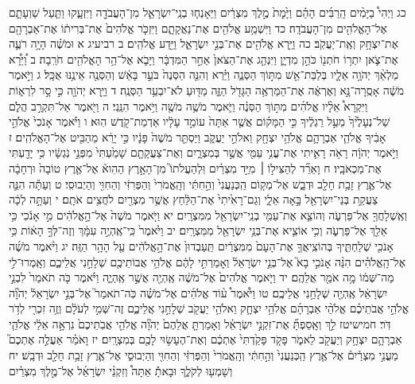 \documentclass[twoside, openany, parskip=half, 11pt]{book}
\begin{document}
כג וַיְהִי֩ בַיָּמִ֨ים הָֽרַבִּ֜ים הָהֵ֗ם וַיָּ֙מׇת֙ מֶ֣לֶךְ מִצְרַ֔יִם וַיֵּאָנְח֧וּ בְנֵֽי־יִשְׂרָאֵ֛ל מִן־הָעֲבֹדָ֖ה וַיִּזְעָ֑קוּ וַתַּ֧עַל שַׁוְעָתָ֛ם אֶל־הָאֱלֹהִ֖ים מִן־הָעֲבֹדָֽה׃ כד וַיִּשְׁמַ֥ע אֱלֹהִ֖ים אֶת־נַאֲקָתָ֑ם וַיִּזְכֹּ֤ר אֱלֹהִים֙ אֶת־בְּרִית֔וֹ אֶת־אַבְרָהָ֖ם אֶת־יִצְחָ֥ק וְאֶֽת־יַעֲקֹֽב׃ כה וַיַּ֥רְא אֱלֹהִ֖ים אֶת־בְּנֵ֣י יִשְׂרָאֵ֑ל וַיֵּ֖דַע אֱלֹהִֽים׃
ב רביעיג א וּמֹשֶׁ֗ה הָיָ֥ה רֹעֶ֛ה אֶת־צֹ֛אן יִתְר֥וֹ חֹתְנ֖וֹ כֹּהֵ֣ן מִדְיָ֑ן וַיִּנְהַ֤ג אֶת־הַצֹּאן֙ אַחַ֣ר הַמִּדְבָּ֔ר וַיָּבֹ֛א אֶל־הַ֥ר הָאֱלֹהִ֖ים חֹרֵֽבָה׃ ב וַ֠יֵּרָ֠א מַלְאַ֨ךְ יְהֹוָ֥ה אֵלָ֛יו בְּלַבַּת־אֵ֖שׁ מִתּ֣וֹךְ הַסְּנֶ֑ה וַיַּ֗רְא וְהִנֵּ֤ה הַסְּנֶה֙ בֹּעֵ֣ר בָּאֵ֔שׁ וְהַסְּנֶ֖ה אֵינֶ֥נּוּ אֻכָּֽל׃ ג וַיֹּ֣אמֶר מֹשֶׁ֔ה אָסֻֽרָה־נָּ֣א וְאֶרְאֶ֔ה אֶת־הַמַּרְאֶ֥ה הַגָּדֹ֖ל הַזֶּ֑ה מַדּ֖וּעַ לֹא־יִבְעַ֥ר הַסְּנֶֽה׃ ד וַיַּ֥רְא יְהֹוָ֖ה כִּ֣י סָ֣ר לִרְא֑וֹת וַיִּקְרָא֩ אֵלָ֨יו אֱלֹהִ֜ים מִתּ֣וֹךְ הַסְּנֶ֗ה וַיֹּ֛אמֶר מֹשֶׁ֥ה מֹשֶׁ֖ה וַיֹּ֥אמֶר הִנֵּֽנִי׃ ה וַיֹּ֖אמֶר אַל־תִּקְרַ֣ב הֲלֹ֑ם שַׁל־נְעָלֶ֙יךָ֙ מֵעַ֣ל רַגְלֶ֔יךָ כִּ֣י הַמָּק֗וֹם אֲשֶׁ֤ר אַתָּה֙ עוֹמֵ֣ד עָלָ֔יו אַדְמַת־קֹ֖דֶשׁ הֽוּא׃ ו וַיֹּ֗אמֶר אָנֹכִי֙ אֱלֹהֵ֣י אָבִ֔יךָ אֱלֹהֵ֧י אַבְרָהָ֛ם אֱלֹהֵ֥י יִצְחָ֖ק וֵאלֹהֵ֣י יַעֲקֹ֑ב וַיַּסְתֵּ֤ר מֹשֶׁה֙ פָּנָ֔יו כִּ֣י יָרֵ֔א מֵהַבִּ֖יט אֶל־הָאֱלֹהִֽים׃ ז וַיֹּ֣אמֶר יְהֹוָ֔ה רָאֹ֥ה רָאִ֛יתִי אֶת־עֳנִ֥י עַמִּ֖י אֲשֶׁ֣ר בְּמִצְרָ֑יִם וְאֶת־צַעֲקָתָ֤ם שָׁמַ֙עְתִּי֙ מִפְּנֵ֣י נֹֽגְשָׂ֔יו כִּ֥י יָדַ֖עְתִּי אֶת־מַכְאֹבָֽיו׃ ח וָאֵרֵ֞ד לְהַצִּיל֣וֹ ׀ מִיַּ֣ד מִצְרַ֗יִם וּֽלְהַעֲלֹתוֹ֮ מִן־הָאָ֣רֶץ הַהִוא֒ אֶל־אֶ֤רֶץ טוֹבָה֙ וּרְחָבָ֔ה אֶל־אֶ֛רֶץ זָבַ֥ת חָלָ֖ב וּדְבָ֑שׁ אֶל־מְק֤וֹם הַֽכְּנַעֲנִי֙ וְהַ֣חִתִּ֔י וְהָֽאֱמֹרִי֙ וְהַפְּרִזִּ֔י וְהַחִוִּ֖י וְהַיְבוּסִֽי׃ ט וְעַתָּ֕ה הִנֵּ֛ה צַעֲקַ֥ת בְּנֵי־יִשְׂרָאֵ֖ל בָּ֣אָה אֵלָ֑י וְגַם־רָאִ֙יתִי֙ אֶת־הַלַּ֔חַץ אֲשֶׁ֥ר מִצְרַ֖יִם לֹחֲצִ֥ים אֹתָֽם׃ י וְעַתָּ֣ה לְכָ֔ה וְאֶֽשְׁלָחֲךָ֖ אֶל־פַּרְעֹ֑ה וְהוֹצֵ֛א אֶת־עַמִּ֥י בְנֵֽי־יִשְׂרָאֵ֖ל מִמִּצְרָֽיִם׃ יא וַיֹּ֤אמֶר מֹשֶׁה֙ אֶל־הָ֣אֱלֹהִ֔ים מִ֣י אָנֹ֔כִי כִּ֥י אֵלֵ֖ךְ אֶל־פַּרְעֹ֑ה וְכִ֥י אוֹצִ֛יא אֶת־בְּנֵ֥י יִשְׂרָאֵ֖ל מִמִּצְרָֽיִם׃ יב וַיֹּ֙אמֶר֙ כִּֽי־אֶֽהְיֶ֣ה עִמָּ֔ךְ וְזֶה־לְּךָ֣ הָא֔וֹת כִּ֥י אָנֹכִ֖י שְׁלַחְתִּ֑יךָ בְּהוֹצִֽיאֲךָ֤ אֶת־הָעָם֙ מִמִּצְרַ֔יִם תַּֽעַבְדוּן֙ אֶת־הָ֣אֱלֹהִ֔ים עַ֖ל הָהָ֥ר הַזֶּֽה׃ יג וַיֹּ֨אמֶר מֹשֶׁ֜ה אֶל־הָֽאֱלֹהִ֗ים הִנֵּ֨ה אָנֹכִ֣י בָא֮ אֶל־בְּנֵ֣י יִשְׂרָאֵל֒ וְאָמַרְתִּ֣י לָהֶ֔ם אֱלֹהֵ֥י אֲבוֹתֵיכֶ֖ם שְׁלָחַ֣נִי אֲלֵיכֶ֑ם וְאָֽמְרוּ־לִ֣י מַה־שְּׁמ֔וֹ מָ֥ה אֹמַ֖ר אֲלֵהֶֽם׃ יד וַיֹּ֤אמֶר אֱלֹהִים֙ אֶל־מֹשֶׁ֔ה אֶֽהְיֶ֖ה אֲשֶׁ֣ר אֶֽהְיֶ֑ה וַיֹּ֗אמֶר כֹּ֤ה תֹאמַר֙ לִבְנֵ֣י יִשְׂרָאֵ֔ל אֶֽהְיֶ֖ה שְׁלָחַ֥נִי אֲלֵיכֶֽם׃ טו וַיֹּ֩אמֶר֩ ע֨וֹד אֱלֹהִ֜ים אֶל־מֹשֶׁ֗ה כֹּֽה־תֹאמַר֮ אֶל־בְּנֵ֣י יִשְׂרָאֵל֒ יְהֹוָ֞ה אֱלֹהֵ֣י אֲבֹתֵיכֶ֗ם אֱלֹהֵ֨י אַבְרָהָ֜ם אֱלֹהֵ֥י יִצְחָ֛ק וֵאלֹהֵ֥י יַעֲקֹ֖ב שְׁלָחַ֣נִי אֲלֵיכֶ֑ם זֶה־שְּׁמִ֣י לְעֹלָ֔ם וְזֶ֥ה זִכְרִ֖י לְדֹ֥ר דֹּֽר׃ חמישיטז לֵ֣ךְ וְאָֽסַפְתָּ֞ אֶת־זִקְנֵ֣י יִשְׂרָאֵ֗ל וְאָמַרְתָּ֤ אֲלֵהֶם֙ יְהֹוָ֞ה אֱלֹהֵ֤י אֲבֹֽתֵיכֶם֙ נִרְאָ֣ה אֵלַ֔י אֱלֹהֵ֧י אַבְרָהָ֛ם יִצְחָ֥ק וְיַעֲקֹ֖ב לֵאמֹ֑ר פָּקֹ֤ד פָּקַ֙דְתִּי֙ אֶתְכֶ֔ם וְאֶת־הֶעָשׂ֥וּי לָכֶ֖ם בְּמִצְרָֽיִם׃ יז וָאֹמַ֗ר אַעֲלֶ֣ה אֶתְכֶם֮ מֵעֳנִ֣י מִצְרַ֒יִם֒ אֶל־אֶ֤רֶץ הַֽכְּנַעֲנִי֙ וְהַ֣חִתִּ֔י וְהָֽאֱמֹרִי֙ וְהַפְּרִזִּ֔י וְהַחִוִּ֖י וְהַיְבוּסִ֑י אֶל־אֶ֛רֶץ זָבַ֥ת חָלָ֖ב וּדְבָֽשׁ׃ יח וְשָׁמְע֖וּ לְקֹלֶ֑ךָ וּבָאתָ֡ אַתָּה֩ וְזִקְנֵ֨י יִשְׂרָאֵ֜ל אֶל־מֶ֣לֶךְ מִצְרַ֗יִם 
\end{document}
